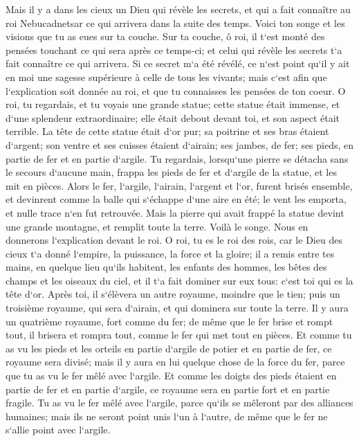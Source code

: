 \verse Mais il y a dans les cieux un Dieu qui révèle les secrets, et qui a fait connaître au roi Nebucadnetsar ce qui arrivera dans la suite des temps. Voici ton songe et les visions que tu as eues sur ta couche. 
\verse Sur ta couche, ô roi, il t`est monté des pensées touchant ce qui sera après ce temps-ci; et celui qui révèle les secrets t`a fait connaître ce qui arrivera. 
\verse Si ce secret m`a été révélé, ce n`est point qu`il y ait en moi une sagesse supérieure à celle de tous les vivants; mais c`est afin que l`explication soit donnée au roi, et que tu connaisses les pensées de ton coeur. 
\verse O roi, tu regardais, et tu voyais une grande statue; cette statue était immense, et d`une splendeur extraordinaire; elle était debout devant toi, et son aspect était terrible. 
\verse La tête de cette statue était d`or pur; sa poitrine et ses bras étaient d`argent; son ventre et ses cuisses étaient d`airain; 
\verse ses jambes, de fer; ses pieds, en partie de fer et en partie d`argile. 
\verse Tu regardais, lorsqu`une pierre se détacha sans le secours d`aucune main, frappa les pieds de fer et d`argile de la statue, et les mit en pièces. 
\verse Alors le fer, l`argile, l`airain, l`argent et l`or, furent brisés ensemble, et devinrent comme la balle qui s`échappe d`une aire en été; le vent les emporta, et nulle trace n`en fut retrouvée. Mais la pierre qui avait frappé la statue devint une grande montagne, et remplit toute la terre. 
\verse Voilà le songe. Nous en donnerons l`explication devant le roi. 
\verse O roi, tu es le roi des rois, car le Dieu des cieux t`a donné l`empire, la puissance, la force et la gloire; 
\verse il a remis entre tes mains, en quelque lieu qu`ils habitent, les enfants des hommes, les bêtes des champs et les oiseaux du ciel, et il t`a fait dominer sur eux tous: c`est toi qui es la tête d`or. 
\verse Après toi, il s`élèvera un autre royaume, moindre que le tien; puis un troisième royaume, qui sera d`airain, et qui dominera sur toute la terre. 
\verse Il y aura un quatrième royaume, fort comme du fer; de même que le fer brise et rompt tout, il brisera et rompra tout, comme le fer qui met tout en pièces. 
\verse Et comme tu as vu les pieds et les orteils en partie d`argile de potier et en partie de fer, ce royaume sera divisé; mais il y aura en lui quelque chose de la force du fer, parce que tu as vu le fer mêlé avec l`argile. 
\verse Et comme les doigts des pieds étaient en partie de fer et en partie d`argile, ce royaume sera en partie fort et en partie fragile. 
\verse Tu as vu le fer mêlé avec l`argile, parce qu`ils se mêleront par des alliances humaines; mais ils ne seront point unis l`un à l`autre, de même que le fer ne s`allie point avec l`argile. 

